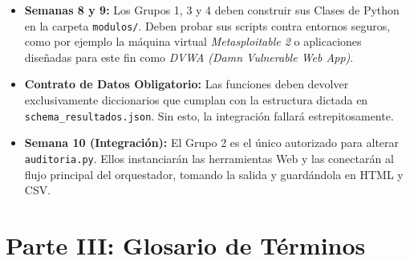 \documentclass[12pt,letterpaper]{article}
\begin{document}
\begin{itemize}
    \item \textbf{Semanas 8 y 9:} Los Grupos 1, 3 y 4 deben construir sus Clases de Python en la carpeta \texttt{modulos/}. Deben probar sus scripts contra entornos seguros, como por ejemplo la máquina virtual \textit{Metasploitable 2} o aplicaciones diseñadas para este fin como \textit{DVWA (Damn Vulnerable Web App)}.
    \item \textbf{Contrato de Datos Obligatorio:} Las funciones deben devolver exclusivamente diccionarios que cumplan con la estructura dictada en \texttt{schema\_resultados.json}. Sin esto, la integración fallará estrepitosamente.
    \item \textbf{Semana 10 (Integración):} El Grupo 2 es el único autorizado para alterar \texttt{auditoria.py}. Ellos instanciarán las herramientas Web y las conectarán al flujo principal del orquestador, tomando la salida y guardándola en HTML y CSV.
\end{itemize}

\vspace{0.5cm}
\begin{center}
\end{center}

\section{Parte III: Glosario de Términos}
\end{document}
